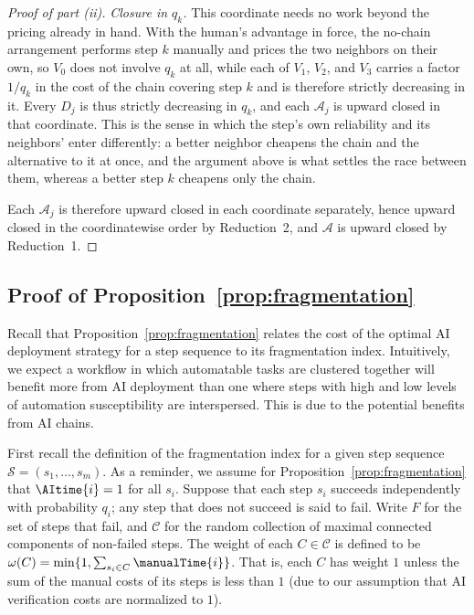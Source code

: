 \begin{proof}[Proof of part (ii)]
\emph{Closure in $q_k$.}
This coordinate needs no work beyond the pricing already in hand.
With the human's advantage in force, the no-chain arrangement performs step $k$ manually and prices the two neighbors on their own, so $V_0$ does not involve $q_k$ at all, while each of $V_1$, $V_2$, and $V_3$ carries a factor $1/q_k$ in the cost of the chain covering step $k$ and is therefore strictly decreasing in it.
Every $D_j$ is thus strictly decreasing in $q_k$, and each $\mathcal{A}_j$ is upward closed in that coordinate.
This is the sense in which the step's own reliability and its neighbors' enter differently: a better neighbor cheapens the chain and the alternative to it at once, and the argument above is what settles the race between them, whereas a better step $k$ cheapens only the chain.

Each $\mathcal{A}_j$ is therefore upward closed in each coordinate separately, hence upward closed in the coordinatewise order by Reduction~2, and $\mathcal{A}$ is upward closed by Reduction~1.
\end{proof}

\subsection{Proof of Proposition~\ref{prop:fragmentation}}
\label{app:fragmentation_proof}

Recall that Proposition~\ref{prop:fragmentation} relates the cost of the optimal AI deployment strategy for a step sequence to its fragmentation index.
Intuitively, we expect a workflow in which automatable tasks are clustered together will benefit more from AI deployment than one where steps with high and low levels of automation susceptibility are interspersed.
This is due to the potential benefits from AI chains.

First recall the definition of the fragmentation index for a given step sequence $\mathcal{S} = (s_1, \dotsc, s_m)$.
As a reminder, we assume for Proposition~\ref{prop:fragmentation} that $\AItime{i} = 1$ for all $s_i$.
Suppose that each step $s_i$ succeeds independently with probability $q_i$; any step that does not succeed is said to fail.
Write $F$ for the set of steps that fail, and $\mathcal{C}$ for the random collection of maximal connected components of non-failed steps.
The weight of each $C \in \mathcal{C}$ is defined to be $\omega(C) = \min\{ 1, \sum_{s_i \in C} \manualTime{i} \}$.
That is, each $C$ has weight $1$ unless the sum of the manual costs of its steps is less than $1$ (due to our assumption that AI verification costs are normalized to $1$).

